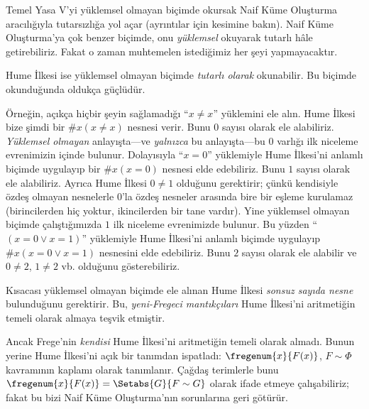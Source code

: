 Temel Yasa V'yi yüklemsel olmayan biçimde okursak Naif Küme Oluşturma
aracılığıyla tutarsızlığa yol açar (ayrıntılar için
 kesimine bakın). Naif Küme Oluşturma'ya çok benzer
biçimde, onu \emph{yüklemsel} okuyarak tutarlı hâle getirebiliriz. Fakat o
zaman muhtemelen istediğimiz her şeyi yapmayacaktır.

Hume İlkesi ise yüklemsel olmayan biçimde \emph{tutarlı olarak} okunabilir.
Bu biçimde okunduğunda oldukça güçlüdür.

Örneğin, açıkça hiçbir şeyin sağlamadığı ``$x\neq x$'' yüklemini ele alın.
Hume İlkesi bize şimdi bir $\#x(x\neq x)$ nesnesi verir. Bunu $0$ sayısı
olarak ele alabiliriz. \emph{Yüklemsel olmayan} anlayışta---ve
\emph{yalnızca} bu anlayışta---bu $0$ varlığı ilk niceleme evrenimizin
içinde bulunur. Dolayısıyla ``$x=0$'' yüklemiyle Hume İlkesi'ni anlamlı
biçimde uygulayıp bir $\#x(x=0)$ nesnesi elde edebiliriz. Bunu $1$ sayısı
olarak ele alabiliriz. Ayrıca Hume İlkesi $0\neq1$ olduğunu gerektirir;
çünkü kendisiyle özdeş olmayan nesnelerle $0$'la özdeş nesneler arasında
bire bir eşleme kurulamaz (birincilerden hiç yoktur, ikincilerden bir tane
vardır). Yine yüklemsel olmayan biçimde çalıştığımızda $1$ ilk niceleme
evrenimizde bulunur. Bu yüzden ``$(x=0\lor x=1)$'' yüklemiyle Hume
İlkesi'ni anlamlı biçimde uygulayıp $\#x(x=0\lor x=1)$ nesnesini elde
edebiliriz. Bunu $2$ sayısı olarak ele alabilir ve $0\neq2$, $1\neq2$ vb.
olduğunu gösterebiliriz.

Kısacası yüklemsel olmayan biçimde ele alınan Hume İlkesi \emph{sonsuz
sayıda nesne} bulunduğunu gerektirir. Bu, \emph{yeni-Fregeci
mantıkçıları} Hume İlkesi'ni aritmetiğin temeli olarak almaya teşvik
etmiştir.

Ancak Frege'nin \emph{kendisi} Hume İlkesi'ni aritmetiğin temeli olarak
almadı. Bunun yerine Hume İlkesi'ni açık bir tanımdan ispatladı:
$\fregenum{x}{F(x)}$, $F\sim\Phi$ kavramının kaplamı olarak tanımlanır.
Çağdaş terimlerle bunu
$\fregenum{x}{F(x)}=\Setabs{G}{F\sim G}$ olarak ifade etmeye çalışabiliriz;
fakat bu bizi Naif Küme Oluşturma'nın sorunlarına geri götürür.

